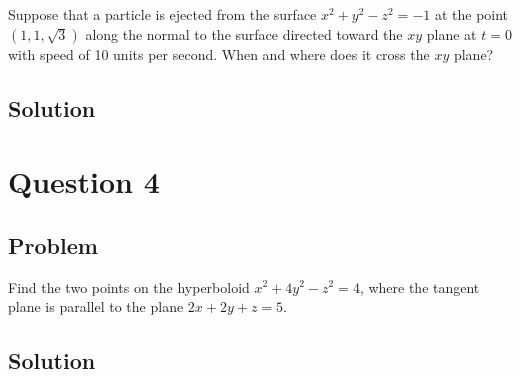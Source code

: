\documentclass[12pt]{article}
\begin{document}
Suppose that a particle is ejected from the surface \(x^2+y^2-z^2=-1\) at the point
\((1,1, \sqrt{3})\) along the normal to the surface directed toward the \(x y\) plane at
\(t=0\) with speed of 10 units per second. When and where does it cross the \(x y\)
plane?

\subsection{Solution}



\newpage
\section{Question 4}

\subsection{Problem}

Find the two points on the hyperboloid \(x^2+4 y^2-z^2=4\),
where the tangent plane is parallel to the plane \(2 x+2 y+z=5\).

\subsection{Solution}



\newpage


\nocite{El-Deeb_PEU-218_Assignments}
\end{document}
